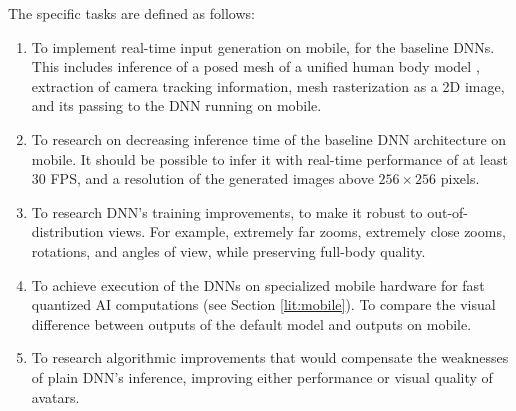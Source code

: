 The specific tasks are defined as follows:
\begin{enumerate}
	\item To implement real-time input generation on mobile, for the baseline DNNs. This includes inference of a posed mesh of a unified human body model \cite{dnn:smplx19}, extraction of camera tracking information, mesh rasterization as a 2D image, and its passing to the DNN running on mobile.
	\item To research on decreasing inference time of the baseline \cite{dnn:stylepeople21} DNN architecture on mobile. It should be possible to infer it with real-time performance of at least 30 FPS, and a resolution of the generated images above $256\times256$ pixels.
	\item To research DNN's training improvements, to make it robust to out-of-distribution views. For example, extremely far zooms, extremely close zooms, rotations, and angles of view, while preserving full-body quality.
	\item To achieve execution of the DNNs on specialized mobile hardware for fast quantized AI computations (see Section \ref{lit:mobile}). To compare the visual difference between outputs of the default model and outputs on mobile.
	\item To research algorithmic improvements that would compensate the weaknesses of plain DNN's inference, improving either performance or visual quality of avatars.

\end{enumerate}

\newpage


